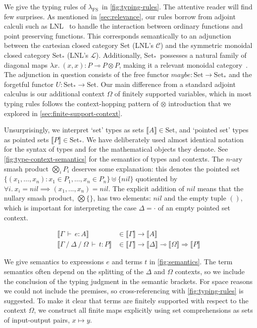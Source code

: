 \documentclass[runningheads]{llncs}
\newcommand\strong[1]{{\bfseries#1}}
\newcommand\todo[1]{{\color{IndianRed}#1}}
\newcommand\xxx{\text{\todo{\strong{XXX}}}}
\newcommand\todolater\todo
\renewcommand\todolater[1]{\todo{\color{RoyalBlue}#1}}
\renewcommand\todo[1]{\ignorespaces}\renewcommand\xxx{\text{\color{IndianRed}\strong{XXX}}}
\newcommand\fslang{\ensuremath{\lambda_{\mathrm{FS}}}}
\newcommand\catname[1]{\ensuremath{\mathrm{#1}}}
\newcommand\Set{\ensuremath{\catname{Set}}}
\newcommand\Point{\ensuremath{\catname{Set}_{*}}}
\newcommand\den[1]{\llbracket{#1}\rrbracket}
\newcommand\name[1]{\ensuremath{\mathit{#1}}}
\newcommand\<\:                 %
\newcommand\fnspace{\<}         %
\newcommand\fn[1]{\lambda{#1}.\fnspace}
\newcommand\fa[1]{\forall{#1}.\fnspace}
\newcommand\lto\multimap        %
\newcommand\fto\Rightarrow
\newcommand\ox\otimes
\newcommand\typename\textit
\newcommand\maybe{\typename{maybe}}
\newcommand\G{\mathrm{\Gamma}}
\newcommand\D{\mathrm{\Delta}}
\renewcommand\O{\mathrm{\Omega}}
\newcommand\emptycx{{\cdot}}
\newcommand\cxsep{\mathbin{/}}
\newcommand\entails{\,\vdash\,}
\newcommand\cJ[3]{{#3} \entails {#1} : {#2}}
\newcommand\J[5]{{#3} \cxsep {#4} \cxsep {#5} \entails {#1} : {#2}}
\newcommand\nil{\name{nil}}
\renewcommand\G\Gamma
\renewcommand\D\Delta
\renewcommand\O\Omega
\begin{document}
We give the typing rules of \fslang\ in \cref{fig:typing-rules}.
The attentive reader will find few surprises.
As mentioned in \cref{sec:relevance}, our rules borrow from adjoint calculi such as LNL~\cite{DBLP:conf/lics/BentonW96,DBLP:conf/csl/Benton94} to handle the interaction between ordinary functions and point preserving functions.
This corresponds semantically to an adjunction between the cartesian closed category $\Set$ (LNL's $\mathcal{C}$) and the symmetric monoidal closed category $\Point$ (LNL's $\mathcal{L}$).
Additionally, \Point\ possesses a natural family of diagonal maps $\fn{x} (x,x) : P \lto P \ox P$, making it a relevant monoidal category~\cite{DBLP:journals/sLogica/Petric02,relevant-categories-and-partial-functions}.
%
The adjunction in question consists of the free functor $\maybe : \Set \to \Point$ and the forgetful functor $U : \Point \to \Set$.
\todolater{more details/intuition?}
%
Our main difference from a standard adjoint calculus is our additional context $\O$ of finitely supported variables, which in most typing rules follows the context-hopping pattern of $\ox$ introduction that we explored in \cref{sec:finite-support-context}.

Unsurprisingly, we interpret `set' types as sets $\den{A} \in \Set$, and `pointed set' types as pointed sets $\den{P} \in \Point$.
We have deliberately used almost identical notation for the syntax of types and for the mathematical objects they denote.
See \cref{fig:type-context-semantics} for the semantics of types and contexts.
%
The $n$-ary smash product $\bigotimes_i P_i$ deserves some explanation: this denotes the pointed set $\{ (x_1, \dots, x_n) : x_1 \in P_1, \dots, x_n \in P_n \} \uplus \{\nil\}$ quotiented by $\fa{i} x_i = \nil \implies (x_1, ..., x_n) = \nil$.
The explicit addition of $\nil$ means that the nullary smash product, $\bigotimes \{\}$, has two elements: $\nil$ and the empty tuple $()$, which is important for interpreting the case $\D = \emptycx$ of an empty pointed set context. \todolater{more intuition}

\begin{align*}
  \den{\cJ e A \G} &\in \den{\G} \to \den{A}\\
  \den{\J t P \G \D \O} &\in \den{\G} \to \den{\D} \lto \den{\O} \fto \den{P}
\end{align*}

\noindent
We give semantics to expressions $e$ and terms $t$ in \cref{fig:semantics}.
The term semantics often depend on the splitting of the $\D$ and $\O$ contexts, so we include the conclusion of the typing judgment in the semantic brackets.
For space reasons we could not include the premises, so cross-referencing with \cref{fig:typing-rules} is suggested.
To make it clear that terms are finitely supported with respect to the context $\O$, we construct all finite maps explicitly using set comprehensions as sets of input-output pairs, $x \mapsto y$. \todolater{this section is underbaked}
\end{document}
